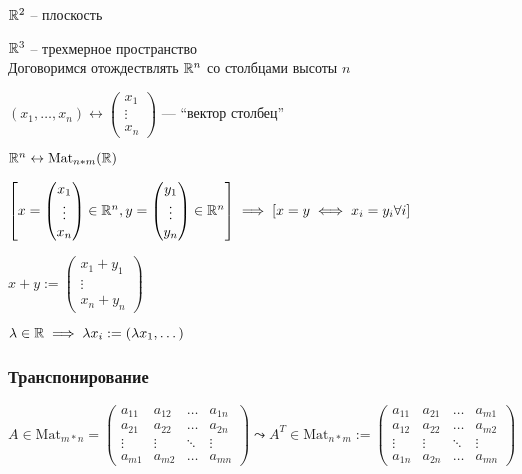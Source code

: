 \( \mathbb{R}^2 \) \quad -- плоскость

\( \mathbb{R}^3 \) \quad -- трехмерное пространство \\

Договоримся отождествлять \( \mathbb{R}^n \) со столбцами высоты \( n \)

\( (x_1, \dots, x_n) \leftrightarrow \left( \begin{smallmatrix}
	x_1 \\ \vdots \\ x_n
\end{smallmatrix} \right) \text{ --- ``вектор столбец''} \)

\( \mathbb{R}^n \leftrightarrow \text{Mat}_{n * m}(\mathbb{R}) \)

\( \left[ x = \begin{pmatrix}
	x_1 \\ \vdots \\ x_n
\end{pmatrix} \in \mathbb{R}^n, y = \begin{pmatrix}
	y_1 \\ \vdots \\ y_n
\end{pmatrix} \in \mathbb{R}^n \right] \implies \left[ x = y \iff x_i = y_i \forall i \right] \)

\( x + y := \begin{pmatrix}
	x_1 + y_1 \\ \vdots \\ x_n + y_n
\end{pmatrix} \)

\( \lambda \in \mathbb{R} \implies \lambda x_i := (\lambda x_1, \dots) \)

\subsubsection{Транспонирование}

\( A \in \text{Mat}_{m*n} = \begin{pmatrix}
	a_{11} & a_{12} & \dots & a_{1n} \\
	a_{21} & a_{22} & \dots & a_{2n} \\
	\vdots & \vdots & \ddots & \vdots \\
	a_{m1} & a_{m2} & \dots & a_{mn}
\end{pmatrix} \leadsto A^T \in \text{Mat}_{n*m} := \begin{pmatrix}
a_{11} & a_{21} & \dots & a_{m1} \\
a_{12} & a_{22} & \dots & a_{m2} \\
\vdots & \vdots & \ddots & \vdots \\
a_{1n} & a_{2n} & \dots & a_{mn}
\end{pmatrix} \)

